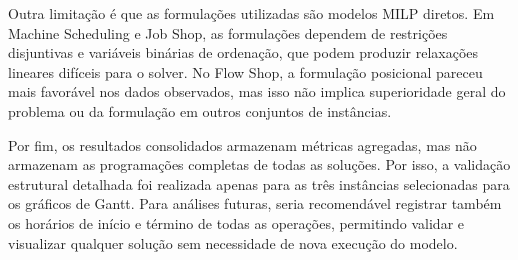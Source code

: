 Outra limitação é que as formulações utilizadas são modelos MILP diretos. Em
Machine Scheduling e Job Shop, as formulações dependem de restrições
disjuntivas e variáveis binárias de ordenação, que podem produzir relaxações
lineares difíceis para o solver. No Flow Shop, a formulação posicional pareceu
mais favorável nos dados observados, mas isso não implica superioridade geral do
problema ou da formulação em outros conjuntos de instâncias.

Por fim, os resultados consolidados armazenam métricas agregadas, mas não
armazenam as programações completas de todas as soluções. Por isso, a validação
estrutural detalhada foi realizada apenas para as três instâncias selecionadas
para os gráficos de Gantt. Para análises futuras, seria recomendável registrar
também os horários de início e término de todas as operações, permitindo validar
e visualizar qualquer solução sem necessidade de nova execução do modelo.
